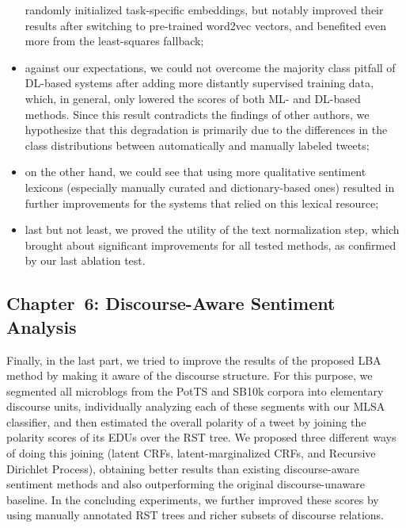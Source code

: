 \documentclass[11pt]{article}
\begin{document}
\begin{itemize}
    randomly initialized task-specific embeddings, but notably
    improved their results after switching to pre-trained word2vec
    vectors, and benefited even more from the least-squares fallback;
  \item against our expectations, we could not overcome the majority
    class pitfall of DL-based systems after adding more distantly
    supervised training data, which, in general, only lowered the
    scores of both ML- and DL-based methods.  Since this result
    contradicts the findings of other authors, we hypothesize that
    this degradation is primarily due to the differences in the class
    distributions between automatically and manually labeled tweets;
  \item on the other hand, we could see that using more qualitative
    sentiment lexicons (especially manually curated and
    dictionary-based ones) resulted in further improvements for the
    systems that relied on this lexical resource;
  \item last but not least, we proved the utility of the text
    normalization step, which brought about significant improvements
    for all tested methods, as confirmed by our last ablation test.
\end{itemize}

\subsection{Chapter~6: Discourse-Aware Sentiment Analysis}

Finally, in the last part, we tried to improve the results of the
proposed LBA method by making it aware of the discourse structure.
For this purpose, we segmented all microblogs from the PotTS and SB10k
corpora into elementary discourse units, individually analyzing each
of these segments with our MLSA classifier, and then estimated the
overall polarity of a tweet by joining the polarity scores of its EDUs
over the RST tree.  We proposed three different ways of doing this
joining (latent CRFs, latent-marginalized CRFs, and Recursive
Dirichlet Process), obtaining better results than existing
discourse-aware sentiment methods and also outperforming the original
discourse-unaware baseline.  In the concluding experiments, we further
improved these scores by using manually annotated RST trees and richer
subsets of discourse relations.
\end{document}
